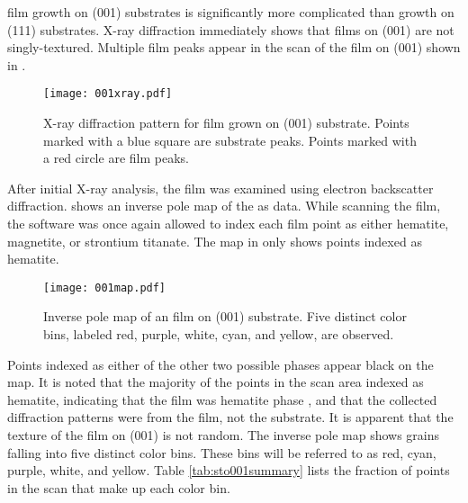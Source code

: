  film growth on (001) substrates is significantly more complicated
than growth on (111) substrates. X-ray diffraction immediately shows that films
on (001) are not singly-textured. Multiple film peaks appear in the
\texttheta{} scan of the  film on (001) shown in
. 
\begin{figure}
\centering
	\texttt{[image: 001xray.pdf]}
	\caption[ pattern for  film on ]{%
		X-ray diffraction pattern for  film grown on 
		 (001) substrate. Points marked with a blue 
		square are substrate peaks. Points marked with a red 
		circle are film peaks.}
	\label{fig:001xray}
\end{figure}
After initial X-ray analysis, the film was examined using electron backscatter
diffraction.  shows an inverse pole map of the as  data. While
scanning the film, the  software was once again allowed to index each film point as
either hematite, magnetite, or strontium titanate. The map in  only
shows points indexed as hematite. 
\begin{figure}
	\texttt{[image: 001map.pdf]}
	\caption[ map of  film on  (001)]{%
		Inverse pole  map of an  film on  (001) 
		substrate. Five distinct color bins, labeled red, purple, white, 
		cyan, and yellow, are observed.}
	\label{fig:001map}
\end{figure}
Points indexed as either of the other two possible phases appear black on the map. It is
noted that the majority of the points in the scan area indexed as hematite, indicating
that the film was hematite phase , and that the collected diffraction patterns
were from the film, not the substrate. It is apparent that the texture of the film on
(001) is not random. The inverse pole map shows grains falling into five
distinct color bins. These bins will be referred to as red, cyan, purple, white, and
yellow. Table \ref{tab:sto001summary} lists the fraction of points in the scan that make
up each color bin. 

